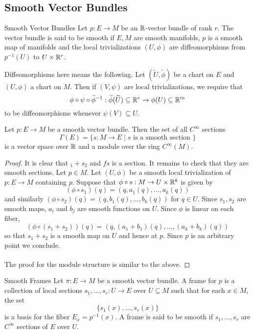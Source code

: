 \documentclass[a4paper]{article}
\begin{document}
\subsection{Smooth Vector Bundles}
\begin{defn}{Smooth Vector Bundles}{} Let $p:E\to M$ be an $\mathbb{R}$-vector bundle of rank $r$. The vector bundle is said to be smooth if $E,M$ are smooth manifolds, $p$ is a smooth map of manifolds and the local trivializations $(U,\phi)$ are diffeomorphisms from $p^{-1}(U)$ to $U\times\mathbb{R}^r$. 
\end{defn}

Diffeomorphisms here means the following. Let $(\widetilde{U},\widetilde{\phi})$ be a chart on $E$ and $(U,\phi)$ a chart on $M$. Then if $(V,\psi)$ are local trivializations, we require that $$\phi\circ\psi\circ\widetilde{\phi}^{-1}:\widetilde{\phi}(\widetilde{U})\subseteq\mathbb{R}^e\to\phi(U)\subseteq\mathbb{R}^m$$ to be diffeomorphisms whenever $\psi(V)\subseteq U$. 

\begin{prp}{}{} Let $p:E\to M$ be a smooth vector bundle. Then the set of all $C^\infty$ sections $$\Gamma(E)=\{s:M\to E\;|\;s\text{ is a smooth section }\}$$ is a vector space over $\mathbb{R}$ and a module over the ring $C^\infty(M)$. \tcbline
\begin{proof}
It is clear that $_1+s_2$ and $fs$ is a section. It remains to check that they are smooth sections. Let $p\in M$. Let $(U,\phi)$ be a smooth local trivialization of $p:E\to M$ containing $p$. Suppose that $\phi\circ s:M\to U\times\mathbb{R}^k$ is given by $$(\phi\circ s_1)(q)=(q,a_1(q),\dots,a_k(q))$$ and similarly $(\phi\circ s_2)(q)=(q,b_1(q),\dots,b_k(q))$ for $q\in U$. Since $s_1,s_2$ are smooth maps, $a_i$ and $b_j$ are smooth functions on $U$. Since $\phi$ is linear on each fiber, $$(\phi\circ(s_1+s_2))(q)=(q,(a_1+b_1)(q),\dots,(a_k+b_k)(q))$$ so that $s_1+s_2$ is a smooth map on $U$ and hence at $p$. Since $p$ is an arbitrary point we conclude. \\~\\

The proof for the module structure is similar to the above. 
\end{proof}
\end{prp}

\begin{defn}{Smooth Frames}{} Let $\pi:E\to M$ be a smooth vector bundle. A frame for $p$ is a collection of local sections $s_1,\dots,s_r:U\to E$ over $U\subseteq M$ such that for each $x\in M$, the set $$\{s_1(x),\dots,s_r(x)\}$$ is a basis for the fiber $E_x=p^{-1}(x)$. A frame is said to be smooth if $s_1,\dots,s_r$ are $C^\infty$ sections of $E$ over $U$. 
\end{defn}
\end{document}
